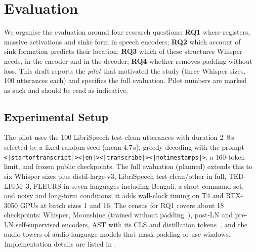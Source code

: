 \section{Evaluation}
\label{sec:evaluation}

We organise the evaluation around four research questions: \textbf{RQ1} where registers, massive activations and sinks form in speech encoders; \textbf{RQ2} which account of sink formation predicts their location; \textbf{RQ3} which of these structures Whisper needs, in the encoder and in the decoder; \textbf{RQ4} whether \method{} removes padding without loss. This draft reports the \emph{pilot} that motivated the study (three Whisper sizes, 100 utterances each) and specifies the full evaluation. Pilot numbers are marked as such and should be read as indicative.

\subsection{Experimental Setup}
\label{sec:setup}

The pilot uses the 100 LibriSpeech test-clean utterances with duration 2--8\,s selected by a fixed random seed (mean 4.7\,s), greedy decoding with the prompt \texttt{<|startoftranscript|><|en|><|transcribe|><|notimestamps|>}, a 160-token limit, and frozen public checkpoints. The full evaluation (planned) extends this to six Whisper sizes plus distil-large-v3, LibriSpeech test-clean/other in full, TED-LIUM~3, FLEURS in seven languages including Bengali, a short-command set, and noisy and long-form conditions; it adds wall-clock timing on T4 and RTX-3050 GPUs at batch sizes 1 and 16. The census for RQ1 covers about 18 checkpoints: Whisper, Moonshine (trained without padding~\cite{jeffries2024moonshine}), post-LN and pre-LN self-supervised encoders, AST with its CLS and distillation tokens~\cite{gong2021ast}, and the audio towers of audio language models that mask padding or use windows. Implementation details are listed in .

